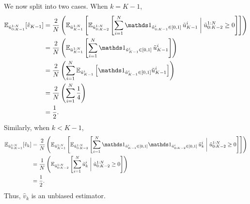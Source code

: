 We now split into two cases. When $k = K-1$,
\begin{align}
    \E_{\tilde{u}_{0:K-1}^{1:N}}[ \hat{v}_{K-1} ]
    &= \frac{2}{N}\left( \E_{\tilde{u}_{K-1}^{1:N}}\left[ \E_{\tilde{u}_{0:K-2}^{1:N}}\left[ \sum_{i=1}^N \ind{\tilde{u}^i_{0:K-1} \in [0, 1]}\, \tilde{u}^i_{K-1} \mathrel{\bigg|} \tilde{u}_{0:K-2}^{1:N} \geq 0\right] \right]
    \right) \\
    &= \frac{2}{N}\left( \E_{\tilde{u}_{K-1}^{1:N}}\left[ \sum_{i=1}^N \ind{\tilde{u}^i_{K-1} \in [0, 1]}\, \tilde{u}^i_{K-1} \right]
    \right) \\
    &= \frac{2}{N}\left( \sum_{i=1}^N \E_{\tilde{u}_{K-1}^{i}}\left[ \ind{\tilde{u}^i_{K-1} \in [0, 1]} \tilde{u}^i_{K-1} \right]
    \right) \\
    &= \frac{2}{N}\left( \sum_{i=1}^N \frac{1}{4} \right) \\
    &= \frac{1}{2}.
\end{align}
Similarly, when $k < K-1$,
\begin{align}
    \E_{\tilde{u}_{0:K-1}^{1:N}}[ \hat{v}_{k} ]
    &= \frac{2}{N}\left( \E_{\tilde{u}_{K-1}^{1:N}}\left[ \E_{\tilde{u}_{0:K-2}^{1:N}}\left[ \sum_{i=1}^N \ind{\tilde{u}^i_{K-1} \in [0, 1]} \ind{\tilde{u}^i_{0:K-2} \in [0, 1]}\, \tilde{u}^i_{k} \mathrel{\bigg|} \tilde{u}_{0:K-2}^{1:N} \geq 0\right] \right]
    \right) \\
    &= \frac{1}{N}\left( \E_{\tilde{u}_{0:K-2}^{1:N}}\left[ \sum_{i=1}^N \tilde{u}^i_{k} \mathrel{\bigg|} \tilde{u}_{0:K-2}^{1:N} \geq 0\right]
    \right) \\
    &= \frac{1}{2}.
\end{align}
Thus, $\hat{v}_k$ is an unbiased estimator.

